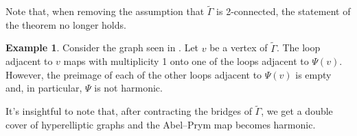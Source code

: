 \documentclass[11pt]{article}
\theoremstyle{definition}
\newtheorem{exam}[theo]{Example}
\numberwithin{equation}{section}
\theoremstyle{definition}
\newcommand{\wt}[1]{\widetilde{#1}}
\begin{document}
Note that, when removing the assumption that $\wt\Gamma$ is 2-connected, the statement of the theorem no longer holds. 

\begin{exam}\label{ex:bridgesRuinEverything}
Consider the graph seen in . Let $v$ be a vertex of $\wt\Gamma$. The loop adjacent to $v$ maps with multiplicity 1 onto one of the loops adjacent to $\Psi(v)$. However, the preimage of each of the other loops adjacent to $\Psi(v)$ is empty and, in particular, $\Psi$ is not harmonic. 

 It's insightful to note that, after contracting the bridges of $\wt\Gamma$, we get a double cover of hyperelliptic graphs and the Abel--Prym map  becomes harmonic.

\end{exam}
\end{document}
